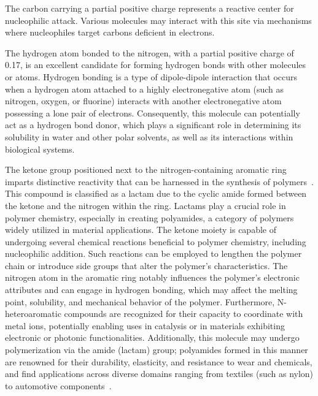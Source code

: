 The carbon carrying a partial positive charge represents a reactive center for nucleophilic attack. Various molecules may interact with this site via mechanisms where nucleophiles target carbons deficient in electrons.

The hydrogen atom bonded to the nitrogen, with a partial positive charge of 0.17, is an excellent candidate for forming hydrogen bonds with other molecules or atoms. Hydrogen bonding is a type of dipole-dipole interaction that occurs when a hydrogen atom attached to a highly electronegative atom (such as nitrogen, oxygen, or fluorine) interacts with another electronegative atom possessing a lone pair of electrons. Consequently, this molecule can potentially act as a hydrogen bond donor, which plays a significant role in determining its solubility in water and other polar solvents, as well as its interactions within biological systems.

The ketone group positioned next to the nitrogen-containing aromatic ring imparts distinctive reactivity that can be harnessed in the synthesis of polymers~\cite{McQuarrieSimonPhysicalChemistry,CareySundbergAdvancedOrganicChemistry,Varghese2022BeyondApplications,Varghese2022BeyondApplications}. This compound is classified as a lactam due to the cyclic amide formed between the ketone and the nitrogen within the ring. Lactams play a crucial role in polymer chemistry, especially in creating polyamides, a category of polymers widely utilized in material applications. The ketone moiety is capable of undergoing several chemical reactions beneficial to polymer chemistry, including nucleophilic addition. Such reactions can be employed to lengthen the polymer chain or introduce side groups that alter the polymer’s characteristics. The nitrogen atom in the aromatic ring notably influences the polymer’s electronic attributes and can engage in hydrogen bonding, which may affect the melting point, solubility, and mechanical behavior of the polymer. Furthermore, N-heteroaromatic compounds are recognized for their capacity to coordinate with metal ions, potentially enabling uses in catalysis or in materials exhibiting electronic or photonic functionalities. Additionally, this molecule may undergo polymerization via the amide (lactam) group; polyamides formed in this manner are renowned for their durability, elasticity, and resistance to wear and chemicals, and find applications across diverse domains ranging from textiles (such as nylon) to automotive components~\cite{Varghese2022BeyondApplications,Varghese2022BeyondApplications}.

